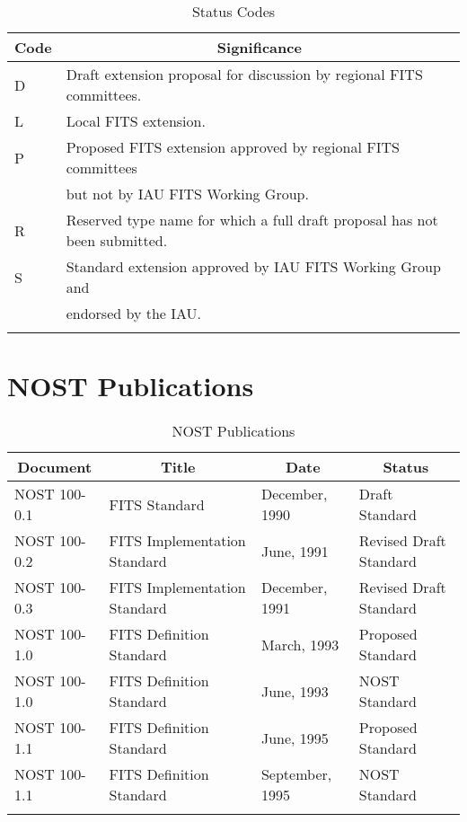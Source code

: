 \medskip

\begin{table}[htpb]
\begin{center}
\begin{tabular}{ll} \\ 
\multicolumn{1}{c}{Code} & \multicolumn{1}{c}{Significance} \\ \hline
  D  & Draft extension proposal for discussion by regional FITS 
committees. \\ 
  L & Local FITS extension. \\
  P & Proposed FITS extension approved by regional FITS committees \\ 
    & but not by IAU FITS Working Group. \\
  R & Reserved type name for which a full draft proposal has not been 
submitted. \\
  S & Standard extension approved by IAU FITS Working Group and \\
    & endorsed by the IAU. \\
                                             \\ \hline

\end{tabular}
\end{center}
\caption[Status Codes]{Status Codes}
\end{table}

\chapter{NOST Publications}

\begin{table}[htpb]
\begin{center}
\begin{tabular}{llll} \\ 
\multicolumn{1}{c}{Document} & \multicolumn{1}{c}{Title} & 
\multicolumn{1}{c}{Date} & \multicolumn{1}{c}{Status}  \\ \hline
NOST 100-0.1 & FITS Standard                & December, 1990 & Draft
Standard  \\ 
NOST 100-0.2 & FITS Implementation Standard & June, 1991    & Revised
Draft Standard  \\ 
NOST 100-0.3 & FITS Implementation Standard & December, 1991 &
Revised Draft Standard  \\
NOST 100-1.0 & FITS Definition Standard  & March, 1993 & Proposed
Standard  \\ 
NOST 100-1.0 & FITS Definition Standard  & June, 1993 & NOST
Standard  \\
NOST 100-1.1 & FITS Definition Standard  & June, 1995 & Proposed
Standard  \\ 
NOST 100-1.1 & FITS Definition Standard  & September, 1995 & NOST
Standard  \\ 
                               &                 &                 \\ \hline
\end{tabular}
\end{center}
\caption[NOST Publications]{NOST Publications}
\end{table}

